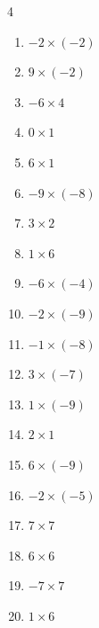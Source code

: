 \begin{multicols}{4}
\begin{enumerate}
  \item $-2\times (-2)$
        \phantom{$=4$}

  \item $9\times (-2)$
        \phantom{$=-18$}

  \item $-6\times 4$
        \phantom{$=-24$}

  \item $0\times 1$
        \phantom{$=0$}

  \item $6\times 1$
        \phantom{$=6$}

  \item $-9\times (-8)$
        \phantom{$=72$}

  \item $3\times 2$
        \phantom{$=6$}

  \item $1\times 6$
        \phantom{$=6$}

  \item $-6\times (-4)$
        \phantom{$=24$}

  \item $-2\times (-9)$
        \phantom{$=18$}

\columnbreak %

\resetques

  \item $-1\times (-8)$
        \phantom{$=8$}

  \item $3\times (-7)$
        \phantom{$=-21$}

  \item $1\times (-9)$
        \phantom{$=-9$}

  \item $2\times 1$
        \phantom{$=2$}

  \item $6\times (-9)$
        \phantom{$=-54$}

  \item $-2\times (-5)$
        \phantom{$=10$}

  \item $7\times 7$
        \phantom{$=49$}

  \item $6\times 6$
        \phantom{$=36$}

  \item $-7\times 7$
        \phantom{$=-49$}

  \item $1\times 6$
        \phantom{$=6$}


\end{enumerate}
\end{multicols}
